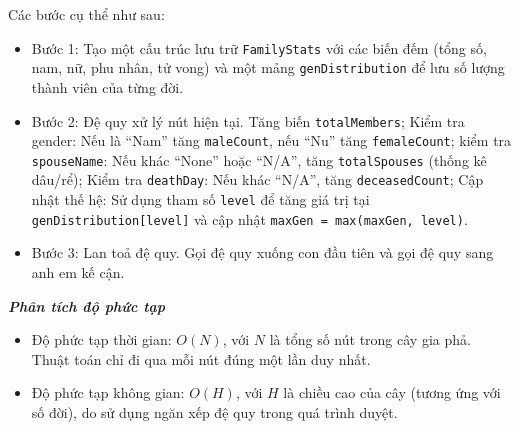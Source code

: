 Các bước cụ thể như sau:
\begin{itemize}
	\item Bước 1: Tạo một cấu trúc lưu trữ \texttt{FamilyStats} với các biến đếm (tổng số, nam, nữ, phu nhân, tử vong) và một mảng \texttt{genDistribution} để lưu số lượng thành viên của từng đời.
	\item Bước 2: Đệ quy xử lý nút hiện tại. Tăng biến \texttt{totalMembers}; Kiểm tra gender: Nếu là ``Nam'' tăng \texttt{maleCount}, nếu ``Nu'' tăng \texttt{femaleCount}; kiểm tra \texttt{spouseName}: Nếu khác ``None'' hoặc ``N/A'', tăng \texttt{totalSpouses} (thống kê dâu/rể); Kiểm tra \texttt{deathDay}: Nếu khác ``N/A'', tăng \texttt{deceasedCount}; Cập nhật thế hệ: Sử dụng tham số \texttt{level} để tăng giá trị tại \texttt{genDistribution[level]} và cập nhật \texttt{maxGen = max(maxGen, level)}.
	\item Bước 3: Lan toả đệ quy. Gọi đệ quy xuống con đầu tiên và gọi đệ quy sang anh em kế cận.
\end{itemize}

\textbf{\textit{Phân tích độ phức tạp}}

\begin{itemize}
	\item Độ phức tạp thời gian: $O(N)$, với $N$ là tổng số nút trong cây gia phả. Thuật toán chỉ đi qua mỗi nút đúng một lần duy nhất.
	\item Độ phức tạp không gian: $O(H)$, với $H$ là chiều cao của cây (tương ứng với số đời), do sử dụng ngăn xếp đệ quy trong quá trình duyệt.
\end{itemize}
